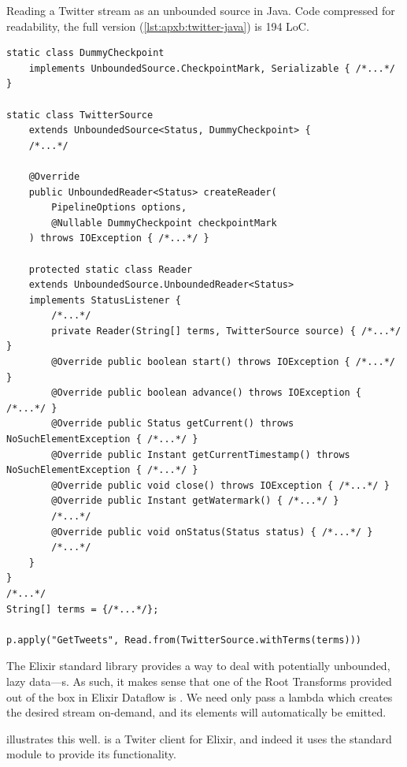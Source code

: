\begin{codelisting}
	\caption[Reading a Twitter stream as an unbounded source in Java.]{Reading a Twitter stream as an unbounded source in Java. Code compressed for readability, the full version (\cref{lst:apxb:twitter-java}) is 194 LoC.}
	\label{lst:eval:twitter-readstream-java}
	\begin{verbatim}
static class DummyCheckpoint
    implements UnboundedSource.CheckpointMark, Serializable { /*...*/ }
    
static class TwitterSource
    extends UnboundedSource<Status, DummyCheckpoint> {
    /*...*/
        
    @Override
    public UnboundedReader<Status> createReader(
        PipelineOptions options,
        @Nullable DummyCheckpoint checkpointMark
    ) throws IOException { /*...*/ }

    protected static class Reader
    extends UnboundedSource.UnboundedReader<Status>
    implements StatusListener {
        /*...*/
        private Reader(String[] terms, TwitterSource source) { /*...*/ }
        @Override public boolean start() throws IOException { /*...*/ }
        @Override public boolean advance() throws IOException { /*...*/ }
        @Override public Status getCurrent() throws NoSuchElementException { /*...*/ }
        @Override public Instant getCurrentTimestamp() throws NoSuchElementException { /*...*/ }
        @Override public void close() throws IOException { /*...*/ }
        @Override public Instant getWatermark() { /*...*/ }
        /*...*/
        @Override public void onStatus(Status status) { /*...*/ }
        /*...*/
    }
}
/*...*/
String[] terms = {/*...*/};

p.apply("GetTweets", Read.from(TwitterSource.withTerms(terms)))
	\end{verbatim}
\end{codelisting}

The Elixir standard library provides a way to deal with potentially unbounded, lazy data---s.
As such, it makes sense that one of the Root Transforms provided out of the box in Elixir Dataflow is .
We need only pass a lambda which creates the desired stream on-demand, and its elements will automatically be emitted.

 illustrates this well.
 is a Twiter client for Elixir, and indeed it uses the standard  module to provide its functionality.

